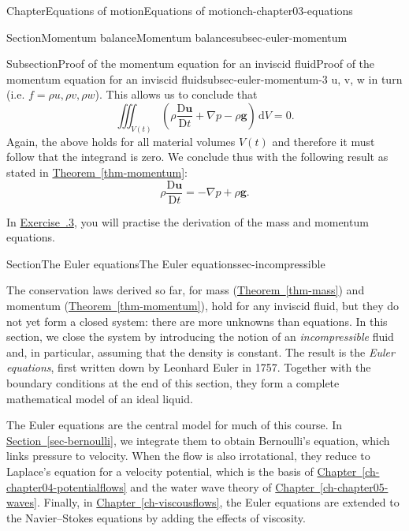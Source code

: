 \documentclass[oneside,10pt,]{book}
\newcommand{\xreffont}{\relax}
\numberwithin{equation}{section}
\newcommand{\de}{\mathrm{d}}
\newcommand{\DD}[2]{\frac{\mathrm{D}#1}{\mathrm{D}#2}}
\newcommand{\bu}{\boldsymbol{u}}
\newcommand{\bg}{\boldsymbol{g}}
\begin{document}
\begin{chapterptx}{Chapter}{Equations of motion}{}{Equations of motion}{}{}{ch-chapter03-equations}
\begin{sectionptx}{Section}{Momentum balance}{}{Momentum balance}{}{}{subsec-euler-momentum}
\begin{subsectionptx}{Subsection}{Proof of the momentum equation for an inviscid fluid}{}{Proof of the momentum equation for an inviscid fluid}{}{}{subsec-euler-momentum-3}
u, v, w\) in turn (i.e. \(f = \rho u, \rho v, \rho w\)). This allows us to conclude that%
\begin{equation*}
\iiint_{V(t)} \left( \rho \DD{\bu}{t} + \nabla p - \rho \bg\right) \, \de{V} = 0.
\end{equation*}
Again, the above holds for all material volumes \(V(t)\) and therefore it must follow that the integrand is zero. We conclude thus with the following result as stated in \hyperref[thm-momentum]{Theorem~{\xreffont\ref{thm-momentum}}}:%
\begin{equation*}
\rho \DD{\bu}{t} = - \nabla p + \rho \bg.
\end{equation*}
%
\par
In \hyperlink{ex-hw-euler-check}{Exercise~{\xreffont 3.6.3}}, you will practise the derivation of the mass and momentum equations.%
\end{subsectionptx}
\end{sectionptx}
%
%
\typeout{************************************************}
\typeout{************************************************}
%
\begin{sectionptx}{Section}{The Euler equations}{}{The Euler equations}{}{}{sec-incompressible}
\begin{introduction}{}%
The conservation laws derived so far, for mass (\hyperref[thm-mass]{Theorem~{\xreffont\ref{thm-mass}}}) and momentum (\hyperref[thm-momentum]{Theorem~{\xreffont\ref{thm-momentum}}}), hold for any inviscid fluid, but they do not yet form a closed system: there are more unknowns than equations. In this section, we close the system by introducing the notion of an \emph{incompressible} fluid and, in particular, assuming that the density is constant. The result is the \emph{Euler equations}, first written down by Leonhard Euler in 1757. Together with the boundary conditions at the end of this section, they form a complete mathematical model of an ideal liquid.%
\par
The Euler equations are the central model for much of this course. In \hyperref[sec-bernoulli]{Section~{\xreffont\ref{sec-bernoulli}}}, we integrate them to obtain Bernoulli's equation, which links pressure to velocity. When the flow is also irrotational, they reduce to Laplace's equation for a velocity potential, which is the basis of \hyperref[ch-chapter04-potentialflows]{Chapter~{\xreffont\ref{ch-chapter04-potentialflows}}} and the water wave theory of \hyperref[ch-chapter05-waves]{Chapter~{\xreffont\ref{ch-chapter05-waves}}}. Finally, in \hyperref[ch-viscousflows]{Chapter~{\xreffont\ref{ch-viscousflows}}}, the Euler equations are extended to the Navier–Stokes equations by adding the effects of viscosity.%

\end{introduction}
\end{sectionptx}
\end{chapterptx}
\end{document}
